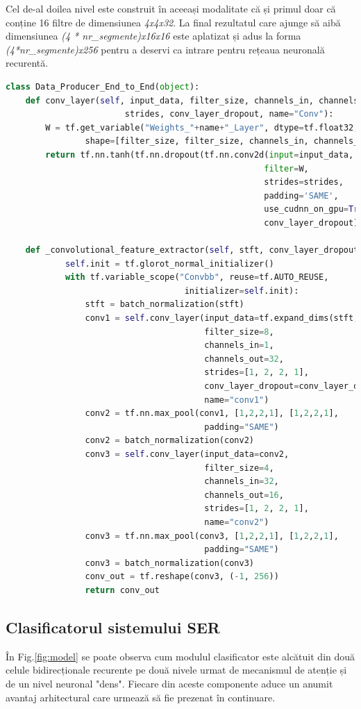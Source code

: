 \documentclass[a4paper,12pt]{book}
\begin{document}
				Cel de-al doilea nivel este construit în aceeași modalitate că și primul doar că conține 16 filtre de dimensiunea \textit{4x4x32}. La final rezultatul care ajunge să aibă dimensiunea \textit{(4 * nr\_segmente)x16x16} este aplatizat și adus la forma \textit{(4*nr\_segmente)x256} pentru a deservi ca intrare pentru rețeaua neuronală recurentă. 
				\begin{lstlisting}[language=Python, caption={Implementarea nivelelor convoluționale care realizează extragerea caracteristicilor în manieră end-to-end folosind procedurile librăriei Tensorflow.}, xleftmargin=-1cm, label=cnn_code]
class Data_Producer_End_to_End(object):
	def conv_layer(self, input_data, filter_size, channels_in, channels_out, 
						strides, conv_layer_dropout, name="Conv"):
		W = tf.get_variable("Weights_"+name+"_Layer", dtype=tf.float32, 
				shape=[filter_size, filter_size, channels_in, channels_out])
		return tf.nn.tanh(tf.nn.dropout(tf.nn.conv2d(input=input_data, 
													filter=W, 
													strides=strides, 
													padding='SAME', 
													use_cudnn_on_gpu=True), 
													conv_layer_dropout))
					
	def _convolutional_feature_extractor(self, stft, conv_layer_dropout):
			self.init = tf.glorot_normal_initializer()
			with tf.variable_scope("Convbb", reuse=tf.AUTO_REUSE, 
									initializer=self.init):
				stft = batch_normalization(stft)
				conv1 = self.conv_layer(input_data=tf.expand_dims(stft,axis=3),
										filter_size=8, 
										channels_in=1, 
										channels_out=32, 
										strides=[1, 2, 2, 1], 
										conv_layer_dropout=conv_layer_dropout, 
										name="conv1")			
				conv2 = tf.nn.max_pool(conv1, [1,2,2,1], [1,2,2,1], 
										padding="SAME")
				conv2 = batch_normalization(conv2)
				conv3 = self.conv_layer(input_data=conv2, 
										filter_size=4, 
										channels_in=32,
										channels_out=16, 
										strides=[1, 2, 2, 1], 										conv_layer_dropout=conv_layer_dropout, 
										name="conv2")				
				conv3 = tf.nn.max_pool(conv3, [1,2,2,1], [1,2,2,1], 
										padding="SAME")
				conv3 = batch_normalization(conv3)
				conv_out = tf.reshape(conv3, (-1, 256))
				return conv_out	\end{lstlisting}		
			
			\subsection{Clasificatorul sistemului SER} \label{clasif_prac}
				În Fig.\ref{fig:model} se poate observa cum modulul clasificator este alcătuit din două celule bidirecționale recurente pe două nivele urmat de mecanismul de atenție și de un nivel neuronal "dens". Fiecare din aceste componente aduce un anumit avantaj arhitectural care urmează să fie prezenat în continuare. \par 
				
\end{document}
